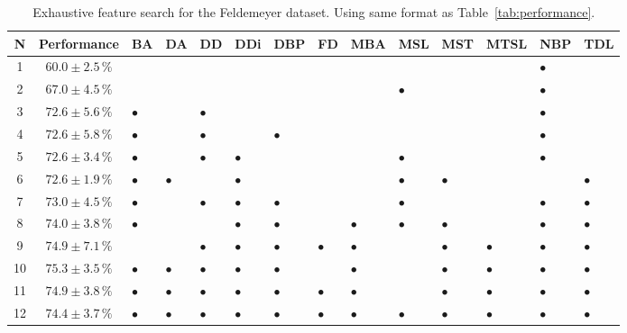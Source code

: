 \documentclass[11pt]{article}
\begin{document}
\begin{table}
\begin{tabular}{ccllllllllllll}
N & Performance  & BA & DA & DD & DDi & DBP & FD & MBA & MSL & MST & MTSL & NBP & TDL\\
\toprule
1 & $60.0 \pm 2.5\,\%$  &  &  &  &  &  &  &  &  &  &  & $\bullet$ & \\
2 & $67.0 \pm 4.5\,\%$  &  &  &  &  &  &  &  & $\bullet$ &  &  & $\bullet$ & \\
3 & $72.6 \pm 5.6\,\%$  & $\bullet$ &  & $\bullet$ &  &  &  &  &  &  &  & $\bullet$ & \\
4 & $72.6 \pm 5.8\,\%$  & $\bullet$ &  & $\bullet$ &  & $\bullet$ &  &  &  &  &  & $\bullet$ & \\
5 & $72.6 \pm 3.4\,\%$  & $\bullet$ &  & $\bullet$ & $\bullet$ &  &  &  & $\bullet$ &  &  & $\bullet$ & \\
6 & $72.6 \pm 1.9\,\%$  & $\bullet$ & $\bullet$ &  & $\bullet$ &  &  &  & $\bullet$ & $\bullet$ &  &  & $\bullet$\\
7 & $73.0 \pm 4.5\,\%$  & $\bullet$ &  & $\bullet$ & $\bullet$ & $\bullet$ &  &  & $\bullet$ &  &  & $\bullet$ & $\bullet$\\
8 & $74.0 \pm 3.8\,\%$  & $\bullet$ &  &  & $\bullet$ & $\bullet$ &  & $\bullet$ & $\bullet$ & $\bullet$ &  & $\bullet$ & $\bullet$\\
9 & $74.9 \pm 7.1\,\%$  &  &  & $\bullet$ & $\bullet$ & $\bullet$ & $\bullet$ & $\bullet$ &  & $\bullet$ & $\bullet$ & $\bullet$ & $\bullet$\\
10 & $75.3 \pm 3.5\,\%$  & $\bullet$ & $\bullet$ & $\bullet$ & $\bullet$ & $\bullet$ &  & $\bullet$ &  & $\bullet$ & $\bullet$ & $\bullet$ & $\bullet$\\
11 & $74.9 \pm 3.8\,\%$  & $\bullet$ & $\bullet$ & $\bullet$ & $\bullet$ & $\bullet$ & $\bullet$ & $\bullet$ &  & $\bullet$ & $\bullet$ & $\bullet$ & $\bullet$\\
12 & $74.4 \pm 3.7\,\%$  & $\bullet$ & $\bullet$ & $\bullet$ & $\bullet$ & $\bullet$ & $\bullet$ & $\bullet$ & $\bullet$ & $\bullet$ & $\bullet$ & $\bullet$ & $\bullet$\\
\bottomrule
\end{tabular}
\caption{Exhaustive feature search for the Feldemeyer dataset.  Using same format
  as Table~\ref{tab:performance}.}
\end{table}

\end{document}
